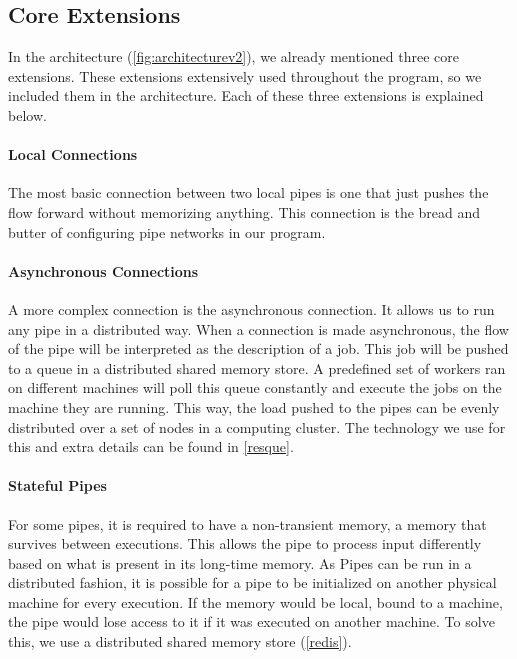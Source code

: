 \subsection{Core Extensions}

In the architecture (\autoref{fig:architecturev2}), we already mentioned three core extensions. These extensions extensively used throughout the program, so we included them in the architecture. Each of these three extensions is explained below.

\paragraph{Local Connections}

The most basic connection between two local pipes is one that just pushes the flow forward without memorizing anything. This connection is the bread and butter of configuring pipe networks in our program.

\paragraph{Asynchronous Connections}

A more complex connection is the asynchronous connection. It allows us to run any pipe in a distributed way. When a connection is made asynchronous, the flow of the pipe will be interpreted as the description of a job. This job will be pushed to a queue in a distributed shared memory store. A predefined set of workers ran on different machines will poll this queue constantly and execute the jobs on the machine they are running. This way, the load pushed to the pipes can be evenly distributed over a set of nodes in a computing cluster. The technology we use for this and extra details can be found in \autoref{resque}.

\paragraph{Stateful Pipes}

For some pipes, it is required to have a non-transient memory, a memory that survives between executions. This allows the pipe to process input differently based on what is present in its long-time memory. As Pipes can be run in a distributed fashion, it is possible for a pipe to be initialized on another physical machine for every execution. If the memory would be local, bound to a machine, the pipe would lose access to it if it was executed on another machine. To solve this, we use a distributed shared memory store (\autoref{redis}).

